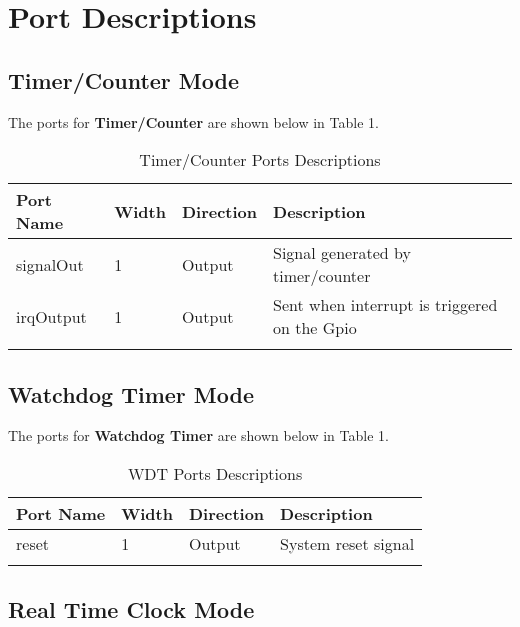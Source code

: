 \section{Port Descriptions}

\subsection{Timer/Counter Mode}

The ports for \textbf{Timer/Counter} are shown below in 
Table 1.
 
\renewcommand*{\arraystretch}{1.4}
\begin{longtable}[H]{
  | p{}
  | p{}
  | p{}
  | p{} |
  }
  \hline
  \textbf{Port Name} &   
  \textbf{Width} &   
  \textbf{Direction} &   
  \textbf{Description} \\ \hline \hline

  signalOut &       
  1 & 
  Output &       
  Signal generated by timer/counter\\ \hline

  irqOutput &      
  1 & 
  Output &     
  Sent when interrupt is triggered on the Gpio \\ \hline
 
 
  \caption{Timer/Counter Ports Descriptions}\label{table:tc}
\end{longtable}

\subsection{Watchdog Timer Mode}

The ports for \textbf{Watchdog Timer} are shown below in 
Table 1.
 
\renewcommand*{\arraystretch}{1.4}
\begin{longtable}[H]{
  | p{}
  | p{}
  | p{}
  | p{} |
  }
  \hline
  \textbf{Port Name} &   
  \textbf{Width} &   
  \textbf{Direction} &   
  \textbf{Description} \\ \hline \hline

  reset &       
  1 & 
  Output &       
  System reset signal\\ \hline

 
  \caption{WDT Ports Descriptions}\label{table:wdt}
\end{longtable}

\subsection{Real Time Clock Mode}

